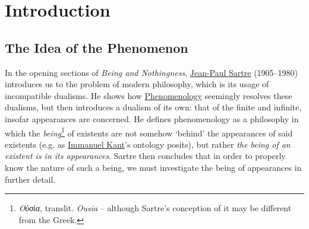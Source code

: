 \chapter{Introduction}
\section{The Idea of the Phenomenon}

In the opening sections of \emph{Being and Nothingness}, \href{https://plato.stanford.edu/entries/sartre/}{Jean-Paul Sartre} (1905–1980) introduces us to the problem of modern philosophy,
which is its usage of incompatible dualisms. He shows how \href{https://plato.stanford.edu/entries/phenomenology/}{Phenomenology} seemingly resolves these dualisms, but then introduces a dualism of its own: that of the finite and infinite, insofar appearances are concerned. He defines phenomenology as a philosophy in which the \emph{being}\footnote{\emph{Οὐσία}, translit. \emph{Ousia} -- although Sartre's conception of it may be different from the Greek.} of existents are not somehow \enquote*{behind} the appearances of said existents (e.g. as \href{https://plato.stanford.edu/entries/kant/}{Immanuel Kant}'s ontology posits), but rather \emph{the being of an existent is in its appearances}. Sartre then concludes that in order to properly know the nature of such a being, we must investigate the being of appearances in further detail.

